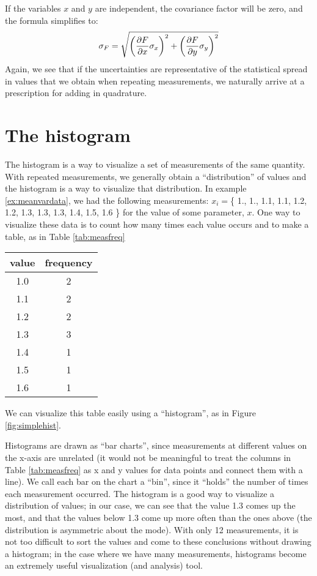 If the variables $x$ and $y$ are independent, the covariance factor will be zero, and the formula simplifies to:
\begin{align*}
\sigma_F=\sqrt{\left(\frac{\partial F}{\partial x}\sigma_x\right)^2+\left(\frac{\partial F}{\partial y}\sigma_y\right)^2}
\end{align*}
Again, we see that if the uncertainties are representative of the statistical spread in values that we obtain when repeating measurements, we naturally arrive at a prescription for adding in quadrature.

\section{The histogram}
The histogram is a way to visualize a set of measurements of the same quantity. With repeated measurements, we generally obtain a ``distribution'' of values and the histogram is a way to visualize that distribution. In example \ref{ex:meanvardata}, we had the following measurements: $x_i=$\{ 1., 1., 1.1, 1.1, 1.2, 1.2, 1.3, 1.3, 1.3, 1.4, 1.5, 1.6 \} for the value of some parameter, $x$. One way to visualize these data is to count how many times each value occurs and to make a table, as in Table \ref{tab:measfreq}
\begin{center}
\center
\begin{tabular}{|c|c|}
\hline
value & frequency\\
\hline
1.0 &2\\
\hline
1.1 &2\\
\hline
1.2 &2\\
\hline
1.3 &3\\
\hline
1.4 &1\\
\hline
1.5 &1\\
\hline
1.6 &1\\
\hline
\end{tabular}
\end{center}

We can visualize this table easily using a ``histogram'', as in Figure \ref{fig:simplehist}.

Histograms are drawn as ``bar charts'', since measurements at different values on the x-axis are unrelated (it would not be meaningful to treat the columns in Table \ref{tab:measfreq} as x and y values for data points and connect them with a line). We call each bar on the chart a ``bin'', since it ``holds'' the number of times each measurement occurred. The histogram is a good way to visualize a distribution of values; in our case, we can see that the value 1.3 comes up the most, and that the values below 1.3 come up more often than the ones above (the distribution is asymmetric about the mode). With only 12 measurements, it is not too difficult to sort the values and come to these conclusions without drawing a histogram; in the case where we have many measurements, histograms become an extremely useful visualization (and analysis) tool.

